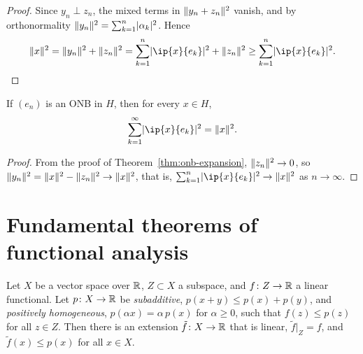 \begin{proof}
Since $y_n \perp z_n$, the mixed terms in $\lVert y_n + z_n\rVert^2$ vanish, and
by orthonormality $\lVert y_n\rVert^2 = \sum_{k=1}^{n} \lvert\alpha_k\rvert^2$. Hence
\[
  \norm{x}^2 = \norm{y_n}^2 + \norm{z_n}^2
  = \sum_{k=1}^{n} \abs{\ip{x}{e_k}}^2 + \norm{z_n}^2
  \ge \sum_{k=1}^{n} \abs{\ip{x}{e_k}}^2 . \qedhere
\]
\end{proof}

\begin{corollary}\label{cor:parseval}
If $(e_n)$ is an ONB in $H$, then for every $x \in H$,
\[
  \sum_{k=1}^{\infty} \abs{\ip{x}{e_k}}^2 = \norm{x}^2 .
\]
\end{corollary}

\begin{proof}
From the proof of Theorem~\ref{thm:onb-expansion}, $\lVert z_n\rVert^2 \to 0$, so
$\lVert y_n\rVert^2 = \lVert x\rVert^2 - \lVert z_n\rVert^2 \to \lVert x\rVert^2$, that is,
$\sum_{k=1}^{n} \abs{\ip{x}{e_k}}^2 \to \norm{x}^2$ as $n \to \infty$.
\end{proof}

\section{Fundamental theorems of functional analysis}

\begin{theorem}\label{thm:hb-vector}
Let $X$ be a vector space over $\mathbb{R}$, $Z \subset X$ a subspace, and
$f \colon Z \to \mathbb{R}$ a linear functional. Let $p \colon X \to \mathbb{R}$ be
\emph{subadditive}, $p(x + y) \le p(x) + p(y)$, and \emph{positively
homogeneous}, $p(\alpha x) = \alpha\, p(x)$ for $\alpha \ge 0$, such that
$f(z) \le p(z)$ for all $z \in Z$. Then there is an extension
$\tilde{f} \colon X \to \mathbb{R}$ that is linear, $\tilde{f}|_Z = f$, and
$\tilde{f}(x) \le p(x)$ for all $x \in X$.
\end{theorem}

